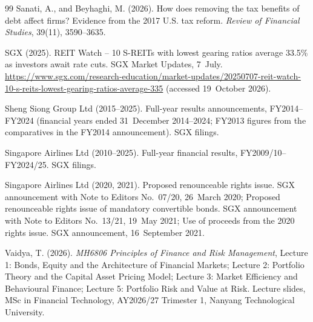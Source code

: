 \begin{thebibliography}{99}
Sanati, A., and Beyhaghi, M. (2026). How does removing the tax benefits of debt affect firms? Evidence from the 2017 U.S. tax reform. \textit{Review of Financial Studies}, 39(11), 3590--3635.

SGX (2025). REIT Watch -- 10 S-REITs with lowest gearing ratios average 33.5\% as investors await rate cuts. SGX Market Updates, 7~July. \url{https://www.sgx.com/research-education/market-updates/20250707-reit-watch-10-s-reits-lowest-gearing-ratios-average-335} (accessed 19~October 2026).

Sheng Siong Group Ltd (2015--2025). Full-year results announcements, FY2014--FY2024 (financial years ended 31~December 2014--2024; FY2013 figures from the comparatives in the FY2014 announcement). SGX filings.

Singapore Airlines Ltd (2010--2025). Full-year financial results, FY2009/10--FY2024/25. SGX filings.

Singapore Airlines Ltd (2020, 2021). Proposed renounceable rights issue. SGX announcement with Note to Editors No.~07/20, 26~March 2020; Proposed renounceable rights issue of mandatory convertible bonds. SGX announcement with Note to Editors No.~13/21, 19~May 2021; Use of proceeds from the 2020 rights issue. SGX announcement, 16~September 2021.

Vaidya, T. (2026). \textit{MH6806 Principles of Finance and Risk Management}, Lecture 1: Bonds, Equity and the Architecture of Financial Markets; Lecture 2: Portfolio Theory and the Capital Asset Pricing Model; Lecture 3: Market Efficiency and Behavioural Finance; Lecture 5: Portfolio Risk and Value at Risk. Lecture slides, MSc in Financial Technology, AY2026/27 Trimester 1, Nanyang Technological University.

\end{thebibliography}
